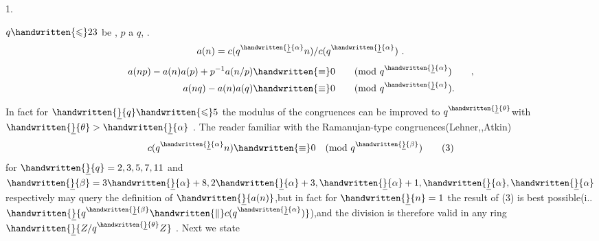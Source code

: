 
 1.

 $q\handwritten{\leqslant}23$ be , $p$  a  $q$, . 
\[
a(n)=c(q^{\handwritten{\underline}{\alpha}}n)/c(q^{\handwritten{\underline}{\alpha}})\ .
\]
\[
\begin{aligned}
a(np)-a(n)a(p)+p^{-1}a(n/p)&\handwritten{\equiv}0 \qquad (\mathrm{mod}\ q^{\handwritten{\underline}{\alpha}})\qquad ,\\
a(nq)-a(n)a(q)&\handwritten{\equiv}0 \qquad (\mathrm{mod}\ q^{\handwritten{\underline}{\alpha}}).
\end{aligned}
\]
\margin{\handwritten{\#}}

In fact for $\handwritten{\underline}{q}\handwritten{\leqslant}5$ the modulus of the congruences can be improved to $q^{\handwritten{\underline}{\theta}}$\reversemarginpar{}\normalmarginpar with $\handwritten{\underline}{\theta}>\handwritten{\underline}{\alpha}$ . The reader familiar with the Ramanujan-type congruences(Lehner,,Atkin)
\[
c(q^{\handwritten{\underline}{\alpha}}n)\handwritten{\equiv}0\quad(\mathrm{mod}\ q^{\handwritten{\underline}{\beta}})
\tag*{(3)}
\]
for $\handwritten{\underline}{q}=2,3,5,7,11$ and $\handwritten{\underline}{\beta}=3\handwritten{\underline}{\alpha}+8,2\handwritten{\underline}{\alpha}+3,\handwritten{\underline}{\alpha}+1,\handwritten{\underline}{\alpha},\handwritten{\underline}{\alpha}$\reversemarginpar{}\normalmarginpar respectively may query the definition of $\handwritten{\underline}{a(n)}$,but in fact for $\handwritten{\underline}{n}=1$ the result of (3) is best possible(i.. $\handwritten{\underline}{q^{\handwritten{\underline}{\beta}}\handwritten{\parallel}c(q^{\handwritten{\underline}{\alpha}})}$),and the division is therefore valid in any ring $\handwritten{\underline}{Z/q^{\handwritten{\underline}{\theta}}Z}$ . Next we state

